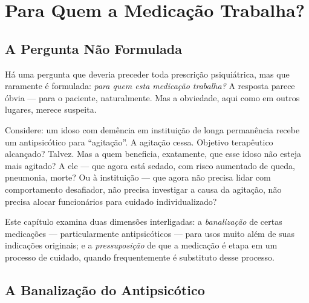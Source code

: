 \chapter{Para Quem a Medicação Trabalha?}
\label{ch:para-quem}

\section{A Pergunta Não Formulada}
\label{sec:pergunta-nao-formulada}

Há uma pergunta que deveria preceder toda prescrição psiquiátrica, mas que raramente é formulada: \textit{para quem esta medicação trabalha?} A resposta parece óbvia --- para o paciente, naturalmente. Mas a obviedade, aqui como em outros lugares, merece suspeita.

Considere: um idoso com demência em instituição de longa permanência recebe um antipsicótico para \enquote{agitação}. A agitação cessa. Objetivo terapêutico alcançado? Talvez. Mas a quem beneficia, exatamente, que esse idoso não esteja mais agitado? A ele --- que agora está sedado, com risco aumentado de queda, pneumonia, morte? Ou à instituição --- que agora não precisa lidar com comportamento desafiador, não precisa investigar a causa da agitação, não precisa alocar funcionários para cuidado individualizado?

Este capítulo examina duas dimensões interligadas: a \textit{banalização} de certas medicações --- particularmente antipsicóticos --- para usos muito além de suas indicações originais; e a \textit{pressuposição} de que a medicação é etapa em um processo de cuidado, quando frequentemente é substituto desse processo.

\section{A Banalização do Antipsicótico}
\label{sec:banalizacao}

